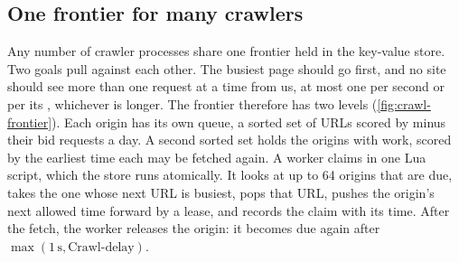 \subsection{One frontier for many crawlers}\label{sec:crawl-frontier}

Any number of crawler processes share one frontier held in the key-value store. Two goals pull against each other. The busiest page should go first, and no site should see more than one request at a time from us, at most one per second or per its , whichever is longer. The frontier therefore has two levels (\cref{fig:crawl-frontier}). Each origin has its own queue, a sorted set of URLs scored by minus their bid requests a day. A second sorted set holds the origins with work, scored by the earliest time each may be fetched again. A worker claims in one Lua script, which the store runs atomically. It looks at up to 64 origins that are due, takes the one whose next URL is busiest, pops that URL, pushes the origin's next allowed time forward by a lease, and records the claim with its time. After the fetch, the worker releases the origin: it becomes due again after $\max(1\,\mathrm{s}, \text{Crawl-delay})$.

